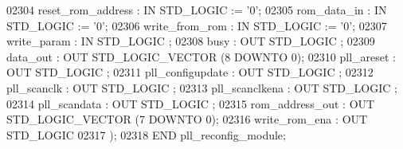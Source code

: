 \begin{DoxyCode}
{02304         \textcolor{vhdlchar}{reset_rom_address}       \textcolor{vhdlchar}{:} \textcolor{keywordflow}{IN} \textcolor{comment}{STD\_LOGIC}  \textcolor{vhdlchar}{:=} \textcolor{vhdlchar}{'}\textcolor{vhdllogic}{}\textcolor{vhdllogic}{0}\textcolor{vhdlchar}{'};
02305         \textcolor{vhdlchar}{rom_data_in}     \textcolor{vhdlchar}{:} \textcolor{keywordflow}{IN} \textcolor{comment}{STD\_LOGIC}  \textcolor{vhdlchar}{:=} \textcolor{vhdlchar}{'}\textcolor{vhdllogic}{}\textcolor{vhdllogic}{0}\textcolor{vhdlchar}{'};
02306         \textcolor{vhdlchar}{write_from_rom}      \textcolor{vhdlchar}{:} \textcolor{keywordflow}{IN} \textcolor{comment}{STD\_LOGIC}  \textcolor{vhdlchar}{:=} \textcolor{vhdlchar}{'}\textcolor{vhdllogic}{}\textcolor{vhdllogic}{0}\textcolor{vhdlchar}{'};
02307         \textcolor{vhdlchar}{write_param}     \textcolor{vhdlchar}{:} \textcolor{keywordflow}{IN} \textcolor{comment}{STD\_LOGIC} ;
02308         \textcolor{vhdlchar}{busy}        \textcolor{vhdlchar}{:} \textcolor{keywordflow}{OUT} \textcolor{comment}{STD\_LOGIC} ;
02309         \textcolor{vhdlchar}{data_out}        \textcolor{vhdlchar}{:} \textcolor{keywordflow}{OUT} \textcolor{comment}{STD\_LOGIC\_VECTOR} \textcolor{vhdlchar}{(}\textcolor{vhdllogic}{}\textcolor{vhdllogic}{8} \textcolor{keywordflow}{DOWNTO} \textcolor{vhdllogic}{}\textcolor{vhdllogic}{0}\textcolor{vhdlchar}{)};
02310         \textcolor{vhdlchar}{pll_areset}      \textcolor{vhdlchar}{:} \textcolor{keywordflow}{OUT} \textcolor{comment}{STD\_LOGIC} ;
02311         \textcolor{vhdlchar}{pll_configupdate}        \textcolor{vhdlchar}{:} \textcolor{keywordflow}{OUT} \textcolor{comment}{STD\_LOGIC} ;
02312         \textcolor{vhdlchar}{pll_scanclk}     \textcolor{vhdlchar}{:} \textcolor{keywordflow}{OUT} \textcolor{comment}{STD\_LOGIC} ;
02313         \textcolor{vhdlchar}{pll_scanclkena}      \textcolor{vhdlchar}{:} \textcolor{keywordflow}{OUT} \textcolor{comment}{STD\_LOGIC} ;
02314         \textcolor{vhdlchar}{pll_scandata}        \textcolor{vhdlchar}{:} \textcolor{keywordflow}{OUT} \textcolor{comment}{STD\_LOGIC} ;
02315         \textcolor{vhdlchar}{rom_address_out}     \textcolor{vhdlchar}{:} \textcolor{keywordflow}{OUT} \textcolor{comment}{STD\_LOGIC\_VECTOR} \textcolor{vhdlchar}{(}\textcolor{vhdllogic}{}\textcolor{vhdllogic}{7} \textcolor{keywordflow}{DOWNTO} \textcolor{vhdllogic}{}\textcolor{vhdllogic}{0}\textcolor{vhdlchar}{)};
02316         \textcolor{vhdlchar}{write_rom_ena}       \textcolor{vhdlchar}{:} \textcolor{keywordflow}{OUT} \textcolor{comment}{STD\_LOGIC} 
02317     \textcolor{vhdlchar}{)};
02318 \textcolor{keywordflow}{END} \textcolor{vhdlchar}{pll\_reconfig\_module};
}
\end{DoxyCode}
